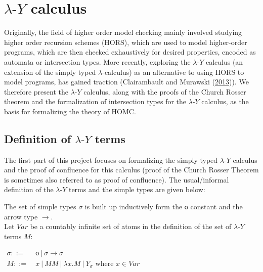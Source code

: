 \documentclass[a4paper, 12pt, twoside]{style/ociamthesis}
\theoremstyle{plain}
\theoremstyle{definition}
\newtheorem{Definition}{Definition}[chapter]
\theoremstyle{remark}
\newcommand{\lamy}{\lambda\text{-}Y}
\renewenvironment{Definition}{\begin{OldDefinition}\begin{mdframed}[style=example, linecolor=cyan]}{\end{mdframed}\end{OldDefinition}}
\begin{document}
\newpage

\section{\texorpdfstring{\(\lamy\)
calculus}{\textbackslash{}lamy calculus}}\label{lamy-calculus}

Originally, the field of higher order model checking mainly involved
studying higher order recursion schemes (HORS), which are used to model
higher-order programs, which are then checked exhaustively for desired
properties, encoded as automata or intersection types. More recently,
exploring the \(\lamy\) calculus (an extension of the simply typed
\(\lambda\)-calculus) as an alternative to using HORS to model programs,
has gained traction (Clairambault and Murawski
(\protect\hyperlink{ref-clairambault13}{2013})). We therefore present
the \(\lamy\) calculus, along with the proofs of the Church Rosser
theorem and the formalization of intersection types for the \(\lamy\)
calculus, as the basis for formalizing the theory of HOMC.

\subsection{\texorpdfstring{Definition of \(\lamy\)
terms}{Definition of \textbackslash{}lamy terms}}\label{definition-of-lamy-terms}

The first part of this project focuses on formalizing the simply typed
\(\lamy\) calculus and the proof of confluence for this calculus (proof
of the Church Rosser Theorem is sometimes also referred to as proof of
confluence). The usual/informal definition of the \(\lamy\) terms and
the simple types are given below:\\

\begin{Definition}[$\lamy$ types and terms]

The set of simple types \(\sigma\) is built up inductively form the
\(\mathsf{o}\) constant and the arrow type \(\to\).\\
Let \(Var\) be a countably infinite set of atoms in the definition of
the set of \(\lamy\) terms \(M\): \label{Definition:lamyTrms}

\begin{center}
$\begin{aligned}
\sigma ::=&\ \mathsf{o}\ |\ \sigma \to \sigma \\
M ::=&\ x\ |\ MM\ |\ \lambda x.M\ |\ Y_\sigma \text{ where }x \in Var
\end{aligned}$
\end{center}

\end{Definition}
\end{document}

